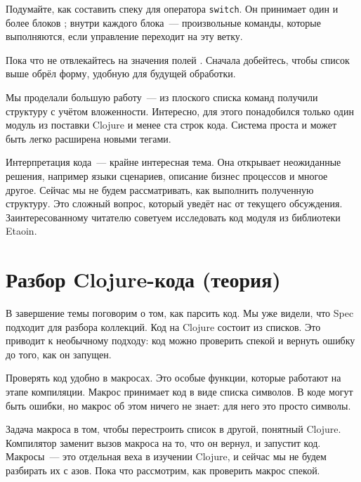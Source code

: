 Подумайте, как составить спеку для оператора \texttt{switch}. Он принимает один
и более блоков ; внутри каждого блока~--- произвольные команды,
которые выполняются, если управление переходит на эту ветку.


\begin{clojure}
\end{clojure}


Пока что не отвлекайтесь на значения полей . Сначала добейтесь,
чтобы список выше обрёл форму, удобную для будущей обработки.

Мы проделали большую работу~--- из плоского списка команд получили структуру с
учётом вложенности. Интересно, для этого понадобился только один модуль из
поставки Clojure и менее ста строк кода. Система проста и может быть легко
расширена новыми тегами.

Интерпретация кода~--- крайне интересная тема. Она открывает неожиданные
решения, например языки сценариев, описание бизнес процессов и многое
другое. Сейчас мы не будем рассматривать, как выполнить полученную
структуру. Это сложный вопрос, который уведёт нас от текущего
обсуждения. Заинтересованному читателю советуем исследовать код модуля
 из библиотеки Etaoin.

\section{Разбор Clojure-кода (теория)}


В завершение темы поговорим о том, как парсить код. Мы уже видели, что Spec
подходит для разбора коллекций. Код на Clojure состоит из списков. Это приводит
к необычному подходу: код можно проверить спекой и вернуть ошибку до того, как
он запущен.

Проверять код удобно в макросах. Это особые функции, которые работают на этапе
компиляции. Макрос принимает код в виде списка символов. В коде могут быть
ошибки, но макрос об этом ничего не знает: для него это просто символы.

Задача макроса в том, чтобы перестроить список в другой, понятный
Clojure. Компилятор заменит вызов макроса на то, что он вернул, и запустит
код. Макросы~--- это отдельная веха в изучении Clojure, и сейчас мы не будем
разбирать их с азов. Пока что рассмотрим, как проверить макрос спекой.

